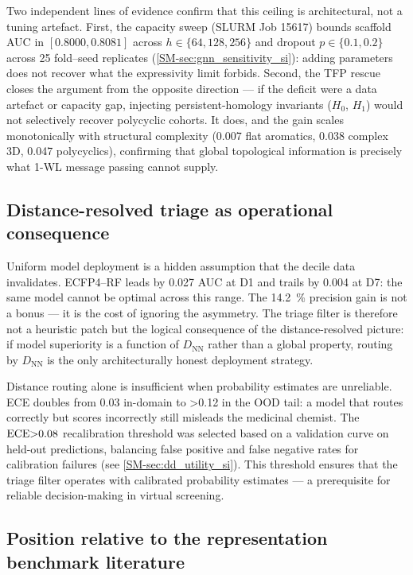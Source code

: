 \documentclass[11pt,a4paper]{article}
\begin{document}
Two independent lines of evidence confirm that this ceiling is architectural, not a tuning artefact. First, the capacity sweep (SLURM Job 15617) bounds scaffold AUC in $[\num{0.8000}, \num{0.8081}]$ across $h \in \{\num{64}, \num{128}, \num{256}\}$ and dropout $p \in \{\num{0.1}, \num{0.2}\}$ across \num{25} fold--seed replicates (\cref{SM-sec:gnn_sensitivity_si}): adding parameters does not recover what the expressivity limit forbids. Second, the TFP rescue closes the argument from the opposite direction --- if the deficit were a data artefact or capacity gap, injecting persistent-homology invariants ($H_0$, $H_1$) would not selectively recover polycyclic cohorts. It does, and the gain scales monotonically with structural complexity (\num{+0.007} flat aromatics, \num{+0.038} complex 3D, \num{+0.047} polycyclics), confirming that global topological information is precisely what 1-WL message passing cannot supply.

\subsection{Distance-resolved triage as operational consequence}

Uniform model deployment is a hidden assumption that the decile data invalidates. ECFP4--RF leads by \num{0.027} AUC at D1 and trails by \num{0.004} at D7: the same model cannot be optimal across this range. The \qty{+14.2}{\percent} precision gain is not a bonus --- it is the cost of ignoring the asymmetry. The triage filter is therefore not a heuristic patch but the logical consequence of the distance-resolved picture: if model superiority is a function of $D_{\text{NN}}$ rather than a global property, routing by $D_{\text{NN}}$ is the only architecturally honest deployment strategy.

Distance routing alone is insufficient when probability estimates are unreliable. ECE doubles from \num{0.03} in-domain to \num{>0.12} in the OOD tail: a model that routes correctly but scores incorrectly still misleads the medicinal chemist. The $\mathrm{ECE} \num{>0.08}$ recalibration threshold was selected based on a validation curve on held-out predictions, balancing false positive and false negative rates for calibration failures (see \cref{SM-sec:dd_utility_si}). This threshold ensures that the triage filter operates with calibrated probability estimates --- a prerequisite for reliable decision-making in virtual screening.

\subsection{Position relative to the representation benchmark literature}
\end{document}
